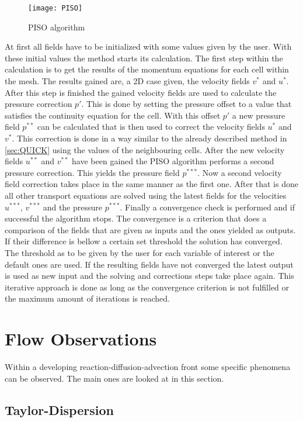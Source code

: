 \documentclass[../thesis.tex]{subfiles}
\begin{document}
\begin{figure}[htbp]
	\centering
	\texttt{[image: PISO]}
	\caption{PISO algorithm}
	\label{fig:PISO}
\end{figure}

At first all fields have to be initialized with some values given by the user. With these initial values the method starts its calculation. The first step within the calculation is to get the results of the momentum equations for each cell within the mesh. The results gained are, a 2D case given, the velocity fields $v^*$ and $u^*$. After this step is finished the gained velocity fields are used to calculate the pressure correction $p'$. This is done by setting the pressure offset to a value that satisfies the continuity equation for the cell. With this offset $p'$ a new pressure field $p^{**}$ can be calculated that is then used to correct the velocity fields $u^*$ and $v^*$. This correction is done in a way similar to the already described method in \autoref{sec:QUICK} using the values of the neighbouring cells. After the new velocity fields $u^{**}$ and $v^{**}$ have been gained the PISO algorithm performs a second pressure correction. This yields the pressure field $p^{***}$. Now a second velocity field correction takes place in the same manner as the first one. After that is done all other transport equations are solved using the latest fields for the velocities $u^{***}$, $v^{***}$ and the pressure $p^{***}$. Finally a convergence check is performed and if successful the algorithm stops. The convergence is a criterion that does a comparison of the fields that are given as inputs and the ones yielded as outputs. If their difference is bellow a certain set threshold the solution has converged. The threshold as to be given by the user for each variable of interest or the default ones are used. If the resulting fields have not converged the latest output is used as new input and the solving and corrections steps take place again. This iterative approach is done as long as the convergence criterion is not fulfilled or the maximum amount of iterations is reached.

\section{Flow Observations}

Within a developing reaction-diffusion-advection front some specific phenomena can be observed. The main ones are looked at in this section.

\subsection{Taylor-Dispersion}
\end{document}
